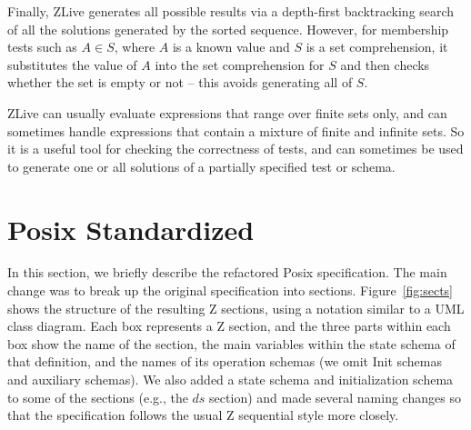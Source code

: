 \documentclass{llncs}
\begin{document}
Finally, ZLive generates all possible results via a depth-first 
backtracking search of all the solutions generated by the sorted sequence.
However, for membership tests such as $A \in S$, where $A$ is a known
value and $S$ is a set comprehension, it substitutes the value of $A$
into the set comprehension for $S$ and then checks whether the set is
empty or not -- this avoids generating all of $S$.

ZLive can usually evaluate expressions that range over finite sets
only, and can sometimes handle expressions that contain a mixture of
finite and infinite sets.  So it is a useful tool for checking the
correctness of tests, and can sometimes be used to generate one
or all solutions of a partially specified test or schema.


\section{Posix Standardized}\label{sect:posix}

In this section, we briefly describe the refactored Posix specification.
The main change was to break up the original specification into sections.
Figure~\ref{fig:sects} shows the structure of the resulting Z
sections, using a notation similar to a UML class diagram.  Each box
represents a Z section, and the three parts within each box show the
name of the section, the main variables within the state schema of
that definition, and the names of its operation schemas (we omit Init
schemas and auxiliary schemas).  We also added a state schema and
initialization schema to some of the sections (e.g., the $ds$ section)
and made several naming changes so that the specification follows the
usual Z sequential style more closely.
\end{document}
